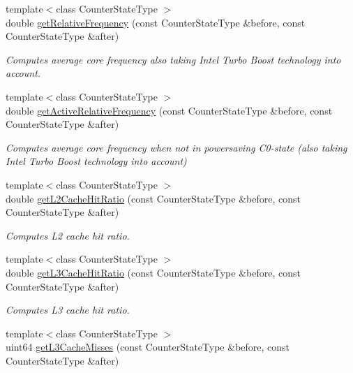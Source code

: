 \begin{DoxyCompactItemize}
{\footnotesize template$<$class Counter\+State\+Type $>$ }\\double \mbox{\hyperlink{class_basic_counter_state_a806e72bc51f05acc4af0667ca3334242}{get\+Relative\+Frequency}} (const Counter\+State\+Type \&before, const Counter\+State\+Type \&after)
\begin{DoxyCompactList}\small\item\em Computes average core frequency also taking Intel Turbo Boost technology into account. \end{DoxyCompactList}\item 
{\footnotesize template$<$class Counter\+State\+Type $>$ }\\double \mbox{\hyperlink{class_basic_counter_state_a9a351e598b8af26131611ff37b592633}{get\+Active\+Relative\+Frequency}} (const Counter\+State\+Type \&before, const Counter\+State\+Type \&after)
\begin{DoxyCompactList}\small\item\em Computes average core frequency when not in powersaving C0-\/state (also taking Intel Turbo Boost technology into account) \end{DoxyCompactList}\item 
{\footnotesize template$<$class Counter\+State\+Type $>$ }\\double \mbox{\hyperlink{class_basic_counter_state_a5922acedeec3c1cc67d20670f8ef0518}{get\+L2\+Cache\+Hit\+Ratio}} (const Counter\+State\+Type \&before, const Counter\+State\+Type \&after)
\begin{DoxyCompactList}\small\item\em Computes L2 cache hit ratio. \end{DoxyCompactList}\item 
{\footnotesize template$<$class Counter\+State\+Type $>$ }\\double \mbox{\hyperlink{class_basic_counter_state_a7b03f0cd02862716d717e897032b7885}{get\+L3\+Cache\+Hit\+Ratio}} (const Counter\+State\+Type \&before, const Counter\+State\+Type \&after)
\begin{DoxyCompactList}\small\item\em Computes L3 cache hit ratio. \end{DoxyCompactList}\item 
{\footnotesize template$<$class Counter\+State\+Type $>$ }\\uint64 \mbox{\hyperlink{class_basic_counter_state_a94118e70266db2ed7fc6b8b7b4e2c343}{get\+L3\+Cache\+Misses}} (const Counter\+State\+Type \&before, const Counter\+State\+Type \&after)

\end{DoxyCompactItemize}

